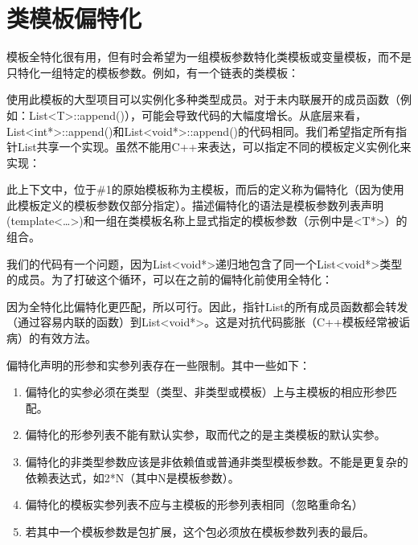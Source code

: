 \section{类模板偏特化}

模板全特化很有用，但有时会希望为一组模板参数特化类模板或变量模板，而不是只特化一组特定的模板参数。例如，有一个链表的类模板：


使用此模板的大型项目可以实例化多种类型成员。对于未内联展开的成员函数（例如：List<T>::append()），可能会导致代码的大幅度增长。从底层来看，List<int*>::append()和List<void*>::append()的代码相同。我们希望指定所有指针List共享一个实现。虽然不能用C++来表达，可以指定不同的模板定义实例化来实现：


此上下文中，位于\#1的原始模板称为主模板，而后的定义称为偏特化（因为使用此模板定义的模板参数仅部分指定）。描述偏特化的语法是模板参数列表声明(template<…>)和一组在类模板名称上显式指定的模板参数（示例中是<T*>）的组合。

我们的代码有一个问题，因为List<void*>递归地包含了同一个List<void*>类型的成员。为了打破这个循环，可以在之前的偏特化前使用全特化：


因为全特化比偏特化更匹配，所以可行。因此，指针List的所有成员函数都会转发（通过容易内联的函数）到List<void*>。这是对抗代码膨胀（C++模板经常被诟病）的有效方法。

偏特化声明的形参和实参列表存在一些限制。其中一些如下：

\begin{enumerate}
\item 
偏特化的实参必须在类型（类型、非类型或模板）上与主模板的相应形参匹配。

\item 
偏特化的形参列表不能有默认实参，取而代之的是主类模板的默认实参。

\item 
偏特化的非类型参数应该是非依赖值或普通非类型模板参数。不能是更复杂的依赖表达式，如2*N（其中N是模板参数）。

\item 
偏特化的模板实参列表不应与主模板的形参列表相同（忽略重命名）

\item 
若其中一个模板参数是包扩展，这个包必须放在模板参数列表的最后。
\end{enumerate}


